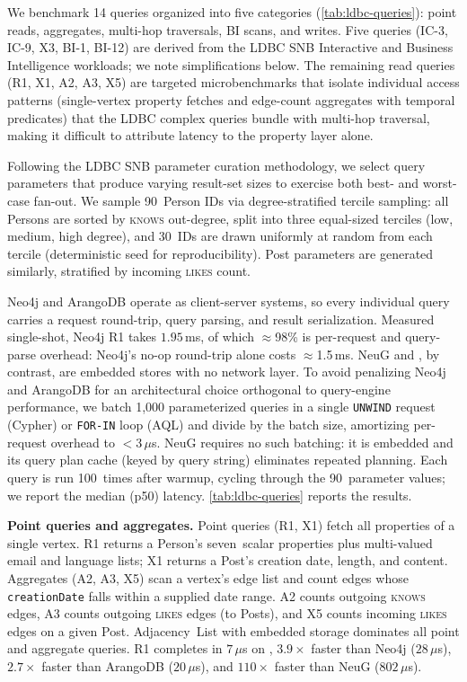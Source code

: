 
We benchmark 14 queries organized into five categories
(\autoref{tab:ldbc-queries}): point reads, aggregates, multi-hop traversals,
BI scans, and writes.
Five queries (IC-3, IC-9, X3, BI-1, BI-12) are derived from the LDBC SNB
Interactive and Business Intelligence workloads; we note simplifications below.
The remaining read queries (R1, X1, A2, A3, X5) are targeted microbenchmarks
that isolate individual access patterns (single-vertex property fetches and
edge-count aggregates with temporal predicates) that the LDBC complex queries
bundle with multi-hop traversal, making it difficult to attribute latency to
the property layer alone.

Following the LDBC SNB parameter curation methodology, we select query
parameters that produce varying result-set sizes to exercise both best- and
worst-case fan-out.
We sample 90~Person IDs via degree-stratified tercile sampling: all Persons are
sorted by \textsc{knows} out-degree, split into three equal-sized terciles
(low, medium, high degree), and 30~IDs are drawn uniformly at random from each
tercile (deterministic seed for reproducibility).
Post parameters are generated similarly, stratified by incoming
\textsc{likes} count.

Neo4j and ArangoDB operate as client-server systems, so every individual query carries a request round-trip, query parsing, and result serialization.
Measured single-shot, Neo4j R1 takes $1.95$\,ms, of which ${\approx}$98\% is per-request and query-parse overhead: Neo4j's no-op round-trip alone costs ${\approx}$1.5\,ms.
NeuG and \project{}, by contrast, are embedded stores with no network layer.
To avoid penalizing Neo4j and ArangoDB for an architectural choice orthogonal to query-engine performance, we batch 1,000 parameterized queries in a single \texttt{UNWIND} request (Cypher) or \texttt{FOR-IN} loop (AQL) and divide by the batch size, amortizing per-request overhead to $<$3\,$\mu$s.
NeuG requires no such batching: it is embedded and its query plan cache (keyed by query string) eliminates repeated planning.
Each query is run 100~times after warmup, cycling through the 90~parameter
values; we report the median (p50) latency.
\autoref{tab:ldbc-queries} reports the results.

\textbf{Point queries and aggregates.}
Point queries (R1, X1) fetch all properties of a single vertex.
R1 returns a Person's seven~scalar properties plus multi-valued email and language
lists; X1 returns a Post's creation date, length, and content.
Aggregates (A2, A3, X5) scan a vertex's edge list and count edges
whose \texttt{creationDate} falls within a supplied date range.
A2 counts outgoing \textsc{knows} edges, A3 counts outgoing \textsc{likes}
edges (to Posts), and X5 counts incoming \textsc{likes} edges on a given Post.
\project{} Adjacency~List with embedded storage dominates all point and aggregate queries.
R1 completes in $7$\,$\mu$s on \project{}, $3.9\times$ faster than Neo4j ($28$\,$\mu$s), $2.7\times$ faster than ArangoDB ($20$\,$\mu$s), and $110\times$ faster than NeuG ($802$\,$\mu$s).

